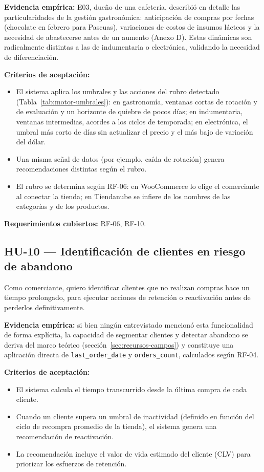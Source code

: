 \noindent\textbf{Evidencia empírica:} E03, dueño de una cafetería, describió en detalle las particularidades de la gestión gastronómica: anticipación de compras por fechas (chocolate en febrero para Pascuas), variaciones de costos de insumos lácteos y la necesidad de abastecerse antes de un aumento (Anexo D). Estas dinámicas son radicalmente distintas a las de indumentaria o electrónica, validando la necesidad de diferenciación.

\noindent\textbf{Criterios de aceptación:}
\begin{itemize}
    \item El sistema aplica los umbrales y las acciones del rubro detectado (Tabla~\ref{tab:motor-umbrales}): en gastronomía, ventanas cortas de rotación y de evaluación y un horizonte de quiebre de pocos días; en indumentaria, ventanas intermedias, acordes a los ciclos de temporada; en electrónica, el umbral más corto de días sin actualizar el precio y el más bajo de variación del dólar.
    \item Una misma señal de datos (por ejemplo, caída de rotación) genera recomendaciones distintas según el rubro.
    \item El rubro se determina según RF-06: en WooCommerce lo elige el comerciante al conectar la tienda; en Tiendanube se infiere de los nombres de las categorías y de los productos.
\end{itemize}

\noindent\textbf{Requerimientos cubiertos:} RF-06, RF-10.

\subsection{HU-10 --- Identificación de clientes en riesgo de abandono}
\label{sec:hu-10}

Como comerciante, quiero identificar clientes que no realizan compras hace un tiempo prolongado, para ejecutar acciones de retención o reactivación antes de perderlos definitivamente.

\noindent\textbf{Evidencia empírica:} si bien ningún entrevistado mencionó esta funcionalidad de forma explícita, la capacidad de segmentar clientes y detectar abandono se deriva del marco teórico (sección~\ref{sec:recursos-campos}) y constituye una aplicación directa de \texttt{last\_order\_date} y \texttt{orders\_count}, calculados según RF-04.

\noindent\textbf{Criterios de aceptación:}
\begin{itemize}
    \item El sistema calcula el tiempo transcurrido desde la última compra de cada cliente.
    \item Cuando un cliente supera un umbral de inactividad (definido en función del ciclo de recompra promedio de la tienda), el sistema genera una recomendación de reactivación.
    \item La recomendación incluye el valor de vida estimado del cliente (CLV) para priorizar los esfuerzos de retención.
\end{itemize}

